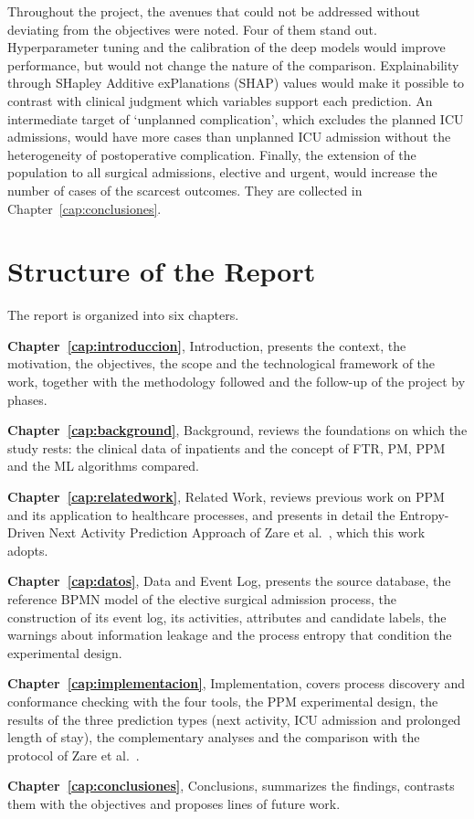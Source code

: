 Throughout the project, the avenues that could not be addressed without deviating from the objectives were noted. Four of them stand out. Hyperparameter tuning and the calibration of the deep models would improve performance, but would not change the nature of the comparison. Explainability through SHapley Additive exPlanations (SHAP) values would make it possible to contrast with clinical judgment which variables support each prediction. An intermediate target of `unplanned complication', which excludes the planned ICU admissions, would have more cases than unplanned ICU admission without the heterogeneity of postoperative complication. Finally, the extension of the population to all surgical admissions, elective and urgent, would increase the number of cases of the scarcest outcomes. They are collected in Chapter~\ref{cap:conclusiones}.

\section{Structure of the Report}

The report is organized into six chapters.

\textbf{Chapter~\ref{cap:introduccion}}, Introduction, presents the context, the motivation, the objectives, the scope and the technological framework of the work, together with the methodology followed and the follow-up of the project by phases.

\textbf{Chapter~\ref{cap:background}}, Background, reviews the foundations on which the study rests: the clinical data of inpatients and the concept of FTR, PM, PPM and the ML algorithms compared.

\textbf{Chapter~\ref{cap:relatedwork}}, Related Work, reviews previous work on PPM and its application to healthcare processes, and presents in detail the Entropy-Driven Next Activity Prediction Approach of Zare et al.\ \cite{zare2025}, which this work adopts.

\textbf{Chapter~\ref{cap:datos}}, Data and Event Log, presents the source database, the reference BPMN model of the elective surgical admission process, the construction of its event log, its activities, attributes and candidate labels, the warnings about information leakage and the process entropy that condition the experimental design.

\textbf{Chapter~\ref{cap:implementacion}}, Implementation, covers process discovery and conformance checking with the four tools, the PPM experimental design, the results of the three prediction types (next activity, ICU admission and prolonged length of stay), the complementary analyses and the comparison with the protocol of Zare et al.\ \cite{zare2025}.

\textbf{Chapter~\ref{cap:conclusiones}}, Conclusions, summarizes the findings, contrasts them with the objectives and proposes lines of future work.
